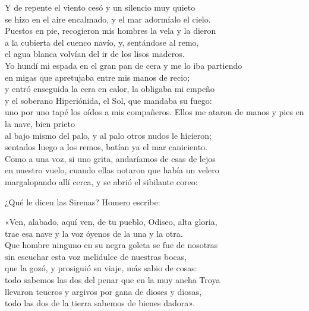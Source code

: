 \begin{versocita}
Y de repente el viento cesó y un silencio muy quieto\\
se hizo en el aire encalmado, y el mar adormíalo el cielo.\\
Puestos en pie, recogieron mis hombres la vela y la dieron\\
a la cubierta del cuenco navío, y, sentándose al remo,\\
el agua blanca volvían del ir de los lisos maderos.\\
Yo hundí mi espada en el gran pan de cera y me lo iba partiendo\\
en migas que apretujaba entre mis manos de recio;\\
y entró enseguida la cera en calor, la obligaba mi empeño\\
y el soberano Hiperiónida, el Sol, que mandaba su fuego:\\
uno por uno tapé los oídos a mis compañeros.
\stanzabreak
Ellos me ataron de manos y pies en la nave, bien prieto\\
al bajo mismo del palo, y al palo otros nudos le hicieron;\\
sentados luego a los remos, batían ya el mar caniciento.\\
Como a una voz, si uno grita, andaríamos de esas de lejos\\
en nuestro vuelo, cuando ellas notaron que había un velero\\
margalopando allí cerca, y se abrió el sibilante coreo:
\end{versocita}

¿Qué le dicen las Sirenas? Homero escribe:

\begin{versocita}
«Ven, alabado, aquí ven, de tu pueblo, Odiseo, alta gloria,\\
trae esa nave y la voz óyenos de la una y la otra.\\
Que hombre ninguno en su negra goleta se fue de nosotras\\
sin escuchar esta voz melidulce de nuestras bocas,\\
que la gozó, y prosiguió su viaje, más sabio de cosas:\\
todo sabemos las dos del penar que en la muy ancha Troya\\
llevaron teucros y argivos por gana de dioses y diosas,\\
todo las dos de la tierra sabemos de bienes dadora».
\end{versocita}

